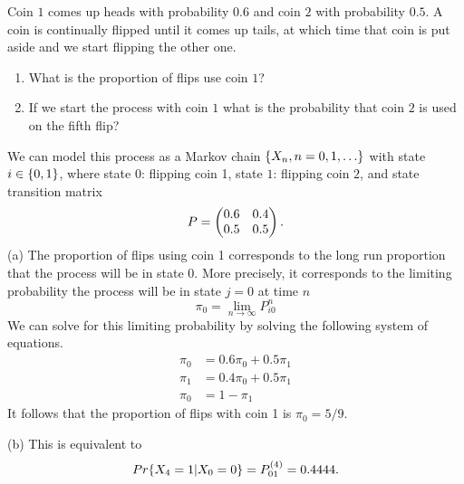 \documentclass{article}
\begin{document}
    \nextproblem

    \begin{problem}
        Coin $1$ comes up heads with probability $0.6$ and coin $2$ with probability $0.5$. A coin is continually flipped until it comes up tails, at which time that coin is put aside and we start flipping the other one.
        \begin{enumerate}
            \item[(a)] What is the proportion of flips use coin $1$?
            \item[(b)] If we start the process with coin $1$ what is the probability that coin $2$ is used on the fifth flip?
        \end{enumerate}
    \end{problem}

    \begin{solution}
        We can model this process as a Markov chain $\{X_n, n=0,1,\ldots\}$ with state $i \in \{0, 1\}$, where state $0$: flipping coin 1, state $1$: flipping coin $2$, and state transition matrix
        \begin{equation*}
            P = \begin{pmatrix} 0.6 & 0.4 \\ 0.5 & 0.5 \end{pmatrix}.
        \end{equation*}
        (a) The proportion of flips using coin 1 corresponds to the long run proportion that the process will be in state 0. More precisely, it corresponds to the limiting probability the process will be in state $j = 0$ at time $n$
        \begin{equation*}
           \pi_0 = \lim_{n \rightarrow \infty} P^n_{i0}
        \end{equation*}
        We can solve for this limiting probability by solving the following system of equations.
        \begin{align*}
            \pi_0 &= 0.6 \pi_0 + 0.5 \pi_1 \\
            \pi_1 &= 0.4 \pi_0 + 0.5 \pi_1 \\
            \pi_0 &= 1 - \pi_1
        \end{align*}
        It follows that the proportion of flips with coin 1 is $\pi_0 = 5/9$.

        (b) This is equivalent to 
        \begin{equation*}
            Pr\{X_4 = 1 | X_0 = 0\} = P^{(4)}_{01} = 0.4444.
        \end{equation*}
        
    \end{solution}
\end{document}
